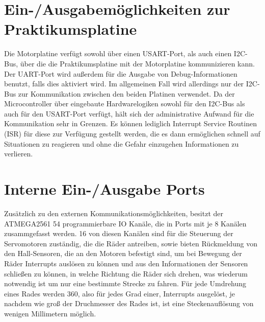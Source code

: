 \section{Ein-/Ausgabemöglichkeiten zur Praktikumsplatine}
Die Motorplatine verfügt sowohl über einen USART-Port, als auch einen I2C-Bus, über die
die Praktikumsplatine mit der Motorplatine kommunizieren kann. Der UART-Port wird außerdem
für die Ausgabe von Debug-Informationen benutzt, falls dies aktiviert wird. Im allgemeinen
Fall wird allerdings nur der I2C-Bus zur Kommunikation zwischen den beiden Platinen verwendet.
Da der Microcontroller über eingebaute Hardwarelogiken sowohl für den I2C-Bus als auch für
den USART-Port verfügt, hält sich der administrative Aufwand für die Kommunikation sehr in
Grenzen. Es können lediglich Interrupt Service Routinen (ISR) für diese zur Verfügung gestellt
werden, die es dann ermöglichen schnell auf Situationen zu reagieren und ohne die Gefahr
einzugehen Informationen zu verlieren.
\section{Interne Ein-/Ausgabe Ports}
Zusätzlich zu den externen Kommunikationsmöglichkeiten, besitzt der ATMEGA2561 54
programmierbare IO Kanäle, die in Ports mit je 8 Kanälen zusammgefasst werden. 16 von diesen
Kanälen sind für die Steuerung der Servomotoren zuständig, die die Räder antreiben, sowie bieten
Rückmeldung von den Hall-Sensoren, die an den Motoren befestigt sind, um bei Bewegung der Räder
Interrupts auslösen zu können und aus den Informationen der Sensoren schließen zu können, in welche
Richtung die Räder sich drehen, was wiederum notwendig ist um nur eine bestimmte Strecke zu fahren.
Für jede Umdrehung eines Rades werden 360, also für jedes Grad einer, Interrupts ausgelöst, je
nachdem wie groß der Druchmesser des Rades ist, ist eine Steckenauflösung  von wenigen Millimetern
möglich.
